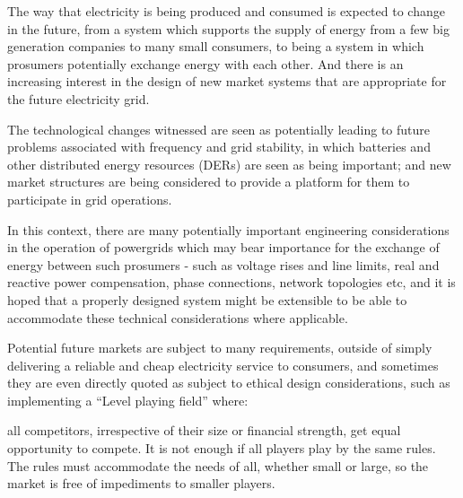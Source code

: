 

The way that electricity is being produced and consumed is expected to change in the future, from a system which supports the supply of energy from a few big generation companies to many small consumers, to being a system in which prosumers potentially exchange energy with each other.
And there is an increasing interest in the design of new market systems that are appropriate for the future electricity grid.

The technological changes witnessed are seen as potentially leading to future problems associated with frequency and grid stability, in which batteries and other distributed energy resources (DERs) are seen as being important; and new market structures are being considered to provide a platform for them to participate in grid operations.

In this context, there are many potentially important engineering considerations in the operation of powergrids which may bear importance for the exchange of energy between such prosumers - such as voltage rises and line limits, real and reactive power compensation, phase connections, network topologies etc, and it is hoped that a properly designed system might be extensible to be able to accommodate these technical considerations where applicable.

Potential future markets are subject to many requirements, outside of simply delivering a reliable and cheap electricity service to consumers, and sometimes they are even directly quoted as subject to ethical design considerations, such as implementing a ``Level playing field'' where:

\DIFdelbegin {}\DIFdelend \DIFaddbegin \begin{displayquote}
\DIFaddend all competitors, irrespective of their size or financial strength, get equal opportunity to compete. It is not enough if all players play by the same rules. The rules must accommodate the needs of all, whether small or large, so the market is free of impediments to smaller players.\DIFdelbegin {}\DIFdelend \DIFaddbegin {}\\\end{displayquote}
\DIFaddend 

